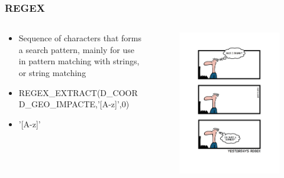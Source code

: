 \documentclass[hyperref={pdfpagelabels=true}]{beamer}
\begin{document}
\begin{frame}
\frametitle{REGEX}
\begin{columns}
  \begin{column}{0.5\textwidth}
    \begin{itemize}
      \item<1->Sequence of characters that forms a search pattern, mainly for use in pattern matching with strings, or string matching%
      \item<2->REGEX\_EXTRACT(D\_COORD\_GEO\_IMPACTE,'[A-z]',0)
      \item<3->'[A-z]'%
    \end{itemize}
  \end{column}  
  \begin{column}{0.5\textwidth}
      \begin{figure}  
	\includegraphics[width=\textwidth]{yesterdays-regex.jpg}\\	
       \end{figure}  
  \end{column}  
\end{columns}        
\end{frame}
\end{document}
